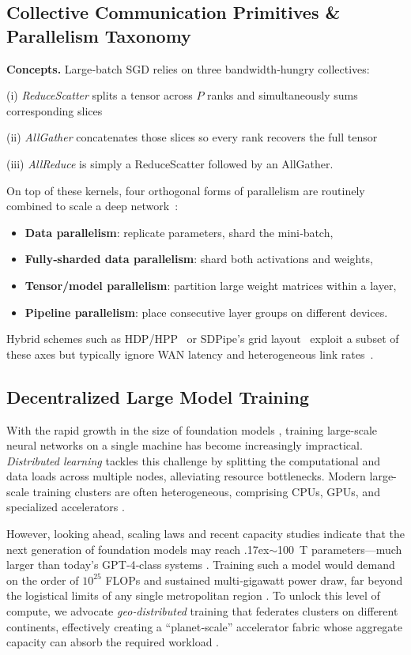 \documentclass{article}
\begin{document}
\subsection{Collective Communication Primitives \& Parallelism Taxonomy}

\textbf{Concepts.}  Large‑batch SGD relies on three bandwidth‑hungry collectives:  

(i) \emph{ReduceScatter} splits a tensor across $P$ ranks and simultaneously sums corresponding slices

(ii) \emph{AllGather} concatenates those slices so every rank recovers the full tensor 

(iii) \emph{AllReduce} is simply a ReduceScatter followed by an AllGather.  

On top of these kernels, four orthogonal forms of parallelism are routinely combined to scale a deep network \cite{scaling-book}: 
\begin{itemize}
\item{\textbf{Data parallelism}}: replicate parameters, shard the mini‑batch,  
\item{\textbf{Fully‑sharded data parallelism}}: shard both activations and weights,  
\item{\textbf{Tensor/model parallelism}}: partition large weight matrices within a layer,
\item{\textbf{Pipeline parallelism}}: place consecutive layer groups on different devices.  
\end{itemize}
Hybrid schemes such as HDP/HPP \cite{ye2024asteroid} or SDPipe’s grid layout \cite{miao2023sdpipe} exploit a subset of these axes but typically ignore WAN latency and heterogeneous link rates \cite{luo2022efficient}.


\subsection{Decentralized Large Model Training}

With the rapid growth in the size of foundation models \cite{achiam2023gpt, touvron2023llama}, training large-scale neural networks on a single machine has become increasingly impractical. \emph{Distributed learning} \cite{chen2021distributed} tackles this challenge by splitting the computational and data loads across multiple nodes, alleviating resource bottlenecks. Modern large-scale training clusters are often heterogeneous, comprising CPUs, GPUs, and specialized accelerators \cite{duan2024efficient}.

However, looking ahead, scaling laws and recent capacity studies indicate that the next generation of foundation models may reach {\raise.17ex\hbox{$\scriptstyle\sim$}}100 T parameters—much larger than today’s GPT‑4‑class systems \cite{gherghescu2024look, achiam2023gpt}. Training such a model would demand on the order of $10^{25}$ FLOPs and sustained multi‑gigawatt power draw, far beyond the logistical limits of any single metropolitan region \cite{gherghescu2024look}. To unlock this level of compute, we advocate \emph{geo‑distributed} training that federates clusters on different continents, effectively creating a “planet‑scale” accelerator fabric whose aggregate capacity can absorb the required workload \cite{yuan2022decentralized}. 
\end{document}
